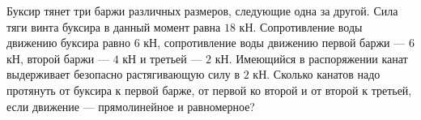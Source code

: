 Буксир тянет три баржи различных размеров, следующие одна за другой.
Сила тяги винта буксира в данный момент  равна $18$ кН. Сопротивление
воды движению буксира равно $6$ кН, сопротивление воды движению первой
баржи --- $6$ кН, второй баржи --- $4$ кН и третьей --- $2$ кН.
Имеющийся в распоряжении канат выдерживает безопасно растягивающую силу
в $2$ кН. Сколько канатов надо протянуть от буксира к первой барже,
от первой ко второй и от второй к третьей, если движение ---
прямолинейное и равномерное?
